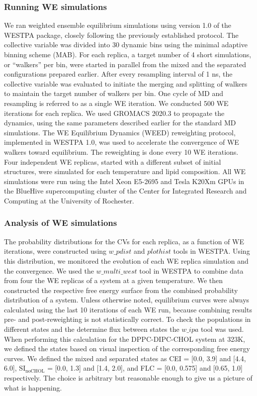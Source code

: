 \documentclass{biophys-new}
\begin{document}
\subsubsection*{Running WE simulations}
We ran weighted ensemble equilibrium simulations using version 1.0 of the WESTPA package\cite{Zwier2015}, closely following the previously established protocol\cite{Bogetti2019}.
The collective variable was divided into 30 dynamic bins using the minimal adaptive binning scheme (MAB)\cite{Torrillo2021}.
For each replica, a target number of 4 short simulations, or ``walkers'' per bin, were started in parallel from the mixed and the separated configurations prepared earlier.
After every resampling interval of 1 ns, the collective variable was evaluated to initiate the merging and splitting of walkers to maintain the target number of walkers per bin. One cycle of MD and resampling is referred to as a single WE iteration.
We conducted 500 WE iterations for each replica.
We used GROMACS 2020.3 to propagate the dynamics, using the same parameters described earlier for the standard MD simulations.
The WE Equilibrium Dynamics (WEED) reweighting protocol\cite{Bhatt2010, Suarez2014}, implemented in WESTPA 1.0, was used to accelerate the convergence of WE walkers toward equilibrium.
The reweighting is done every 10 WE iterations.
Four independent WE replicas, started with a different subset of initial structures, were simulated for each temperature and lipid composition.
All WE simulations were run using the Intel Xeon E5-2695 and Tesla K20Xm GPUs in the BlueHive supercomputing cluster of the Center for Integrated Research and Computing at the University of Rochester.

\subsubsection*{Analysis of WE simulations}
The probability distributions for the CVs for each replica, as a function of WE iterations, were constructed using $w\_pdist$ and $plothist$ tools in WESTPA.
Using this distribution, we monitored the evolution of each WE replica simulation and the convergence.
We used the $w\_multi\_west$ tool in WESTPA to combine data from four the WE replicas of a system at a given temperature.
We then constructed the respective free energy surface from the combined probability distribution of a system. Unless otherwise noted, equilibrium curves were always calculated using the last 10 iterations of each WE run, because combining results pre- and post-reweighting is not statistically correct.
To check the populations in different states and the determine flux between states the $w\_ipa$ tool was used.
When performing this calculation for the DPPC-DIPC-CHOL system at 323K, we defined the states based on visual inspection of the corresponding free energy curves. We defined the mixed and separated states as CEI = [0.0, 3.9] and [4.4, 6.0], $\text{SI}_{\text{noCHOL}}$ = [0.0, 1.3] and [1.4, 2.0], and FLC = [0.0, 0.575] and [0.65, 1.0] respectively.
The choice is arbitrary but reasonable enough to give us a picture of what is happening.
\end{document}
